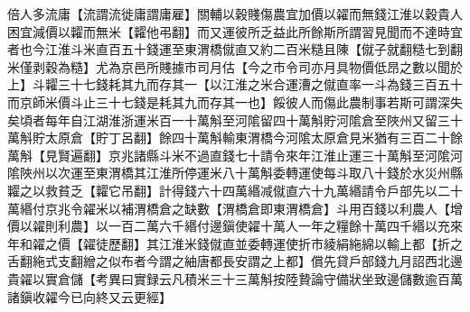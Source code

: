 倍人多流庸【流謂流徙庸謂庸雇】關輔以穀賤傷農宜加價以糴而無錢江淮以穀貴人困宜減價以糶而無米【糶他弔翻】而又運彼所乏益此所餘斯所謂習見聞而不達時宜者也今江淮斗米直百五十錢運至東渭橋僦直又約二百米糙且陳【僦子就翻糙七到翻米僅剥穀為糙】尤為京邑所賤據市司月估【今之市令司亦月具物價低昂之數以聞於上】斗糶三十七錢耗其九而存其一【以江淮之米合運漕之僦直率一斗為錢三百五十而京師米價斗止三十七錢是耗其九而存其一也】餒彼人而傷此農制事若斯可謂深失矣頃者每年自江湖淮浙運米百一十萬斛至河隂留四十萬斛貯河隂倉至陜州又留三十萬斛貯太原倉【貯丁呂翻】餘四十萬斛輸東渭橋今河隂太原倉見米猶有三百二十餘萬斛【見賢遍翻】京兆諸縣斗米不過直錢七十請令來年江淮止運三十萬斛至河隂河隂陜州以次運至東渭橋其江淮所停運米八十萬斛委轉運使每斗取八十錢於水災州縣糶之以救貧乏【糶它吊翻】計得錢六十四萬緡减僦直六十九萬緡請令戶部先以二十萬緡付京兆令糴米以補渭橋倉之缺數【渭橋倉即東渭橋倉】斗用百錢以利農人【增價以糴則利農】以一百二萬六千緡付邊鎭使糴十萬人一年之糧餘十萬四千緡以充來年和糴之價【糴徒歷翻】其江淮米錢僦直並委轉運使折市綾絹絁綿以輸上都【折之舌翻絁式支翻繒之似布者今謂之紬唐都長安謂之上都】償先貸戶部錢九月詔西北邊貴糴以實倉儲【考異曰實録云凡積米三十三萬斛按陸贄論守備狀坐致邊儲數逾百萬諸鎭收糴今已向終又云更經】

